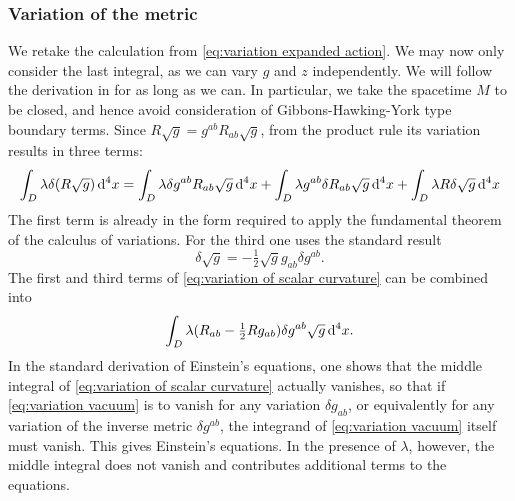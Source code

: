 \documentclass[../main.tex]{subfiles}
\begin{document}
\subsubsection{Variation of the metric}
We retake the calculation from \cref{eq:variation expanded action}. We may now only consider the last integral, as we can vary \(g\) and \(z\) independently. We will follow the
derivation in \cite{Carroll1997} for as long as we can. In particular, we take the spacetime \(M\) to be closed, and hence avoid consideration of Gibbons-Hawking-York type boundary terms. Since \( R\sqrt{g} =
g^{ab}R_{ab}\sqrt{g} \), from the product rule its variation results in three terms:
\begin{equation}\label{eq:variation of scalar curvature}
	\int_D \lambda \delta(R \sqrt{g}) \,\mathrm{d}^4 x = \int_D \lambda \delta g^{ab} R_{ab} \sqrt{g}
	\,\mathrm{d}^4 x + \int_D \lambda g^{ab} \delta R_{ab} \sqrt{g} \,\mathrm{d}^4 x + \int_{D} \lambda R
	\delta\sqrt{g} \,\mathrm{d}^4 x
\end{equation}
The first term is already in the form required to apply the fundamental theorem of the
calculus of variations. For the third one uses the standard result
\begin{equation*}
	\delta \sqrt{g} = -\tfrac{1}{2}\sqrt{g} g_{ab} \delta g^{ab}.
\end{equation*}
The first and third terms of \cref{eq:variation of scalar curvature} can be combined into
\begin{equation}\label{eq:variation vacuum}
	\int_D \lambda (R_{ab} - \tfrac{1}{2} Rg_{ab}) \delta g^{ab} \sqrt{g} \,\mathrm{d}^4 x.
\end{equation}
In the standard derivation of Einstein's equations, one shows that the middle integral of
\cref{eq:variation of scalar curvature} actually vanishes, so that if \cref{eq:variation
vacuum} is to vanish for any variation \( \delta g_{ab} \), or equivalently for any
variation of the inverse metric \( \delta g^{ab} \), the integrand of \cref{eq:variation vacuum} itself must
vanish. This gives Einstein's equations. In the presence of \( \lambda \), however, the
middle integral does not vanish and contributes additional terms to the
equations.
\end{document}
